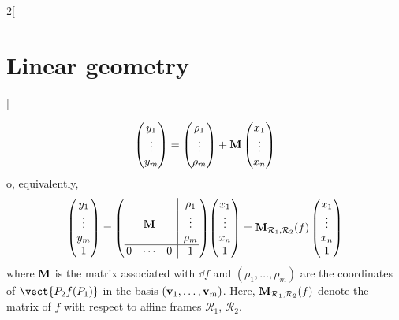 \documentclass[../../../main.tex]{subfiles}
\begin{document}
\begin{multicols}{2}[\section{Linear geometry}]
\begin{prop}
        $$
            \begin{pmatrix}
                y_1    \\
                \vdots \\
                y_m    \\
            \end{pmatrix}
            =
            \begin{pmatrix}
                \rho_1 \\
                \vdots \\
                \rho_m \\
            \end{pmatrix}
            +\boldsymbol{\mathrm{M}}
            \begin{pmatrix}
                x_1    \\
                \vdots \\
                x_n    \\
            \end{pmatrix}$$
        o, equivalently,
        $$
            \begin{pmatrix}
                y_1    \\
                \vdots \\
                y_m    \\
                1      \\
            \end{pmatrix}
            =\left(
            \begin{array}{@{\,}ccc|c@{\,}}
                      &                    &   & \rho_1 \\
                      & \vectorfunction{M} &   & \vdots \\
                      &                    &   & \rho_m \\
                    \hline
                    0 & \cdots             & 0 & 1
                \end{array}\right)\!
            \begin{pmatrix}
                x_1    \\
                \vdots \\
                x_n    \\
                1      \\
            \end{pmatrix}
            =\vectorfunction{M}_{\mathcal{R}_1,\mathcal{R}_2}(f)
            \begin{pmatrix}
                x_1    \\
                \vdots \\
                x_n    \\
                1      \\
            \end{pmatrix}$$
        where $\boldsymbol{\mathrm{M}}$ is the matrix associated with $\dd f$ and $(\rho_1,\ldots,\rho_m)$ are the coordinates of $\vect{P_2f(P_1)}$ in the basis $(\boldsymbol{\mathrm{v}}_1,\ldots,\boldsymbol{\mathrm{v}}_m)$. Here, $\boldsymbol{\mathrm{M}}_{\mathcal{R}_1,\mathcal{R}_2}(f)$ denote the matrix of $f$ with respect to affine frames $\mathcal{R}_1$, $\mathcal{R}_2$.
    \end{prop}

\end{multicols}
\end{document}
